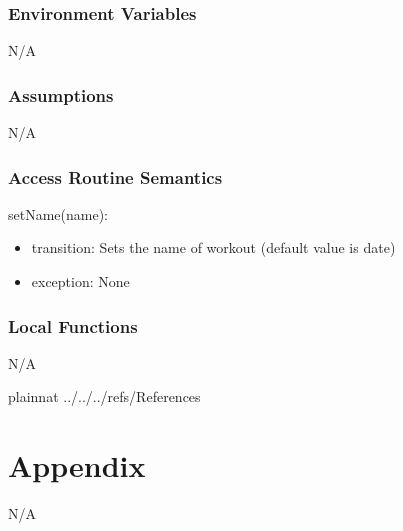 \documentclass[12pt, titlepage]{article}
\begin{document}
\subsubsection{Environment Variables}

N/A

\subsubsection{Assumptions}

N/A

\subsubsection{Access Routine Semantics}

\noindent setName(name):
\begin{itemize}
	\item transition: Sets the name of workout (default value is date)
	\item exception: None
\end{itemize}

\subsubsection{Local Functions}

N/A

\newpage



 {plainnat}
 {../../../refs/References}

\newpage

\section{Appendix} \label{Appendix}

N/A
\end{document}
